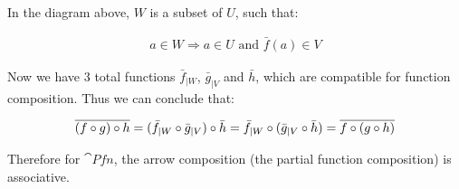 In the diagram above, $W$ is a subset of $U$, such that:

\begin{align*}
a \in W \Rightarrow a \in U \text{ and } \bar{f}(a) \in V
\end{align*}

Now we have 3 total functions $\bar{f}_{|W}$, $\bar{g}_{|V}$ and $\bar{h}$,
which are compatible for function composition. Thus we can conclude that:

\begin{align*}
\overline{(f \circ g) \circ h} =
(\bar{f}_{|W} \circ \bar{g}_{|V}) \circ \bar{h} =
\bar{f}_{|W} \circ (\bar{g}_{|V} \circ \bar{h}) =
\overline{f \circ (g \circ h)}
\end{align*}

Therefore for $\cat{Pfn}$, the arrow composition (the partial function composition)
is associative.

